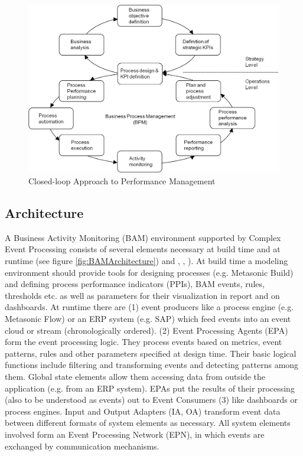 \begin{figure}[htbp]
	\centering
	\includegraphics[width=0.8\linewidth]{Figures/Chapter5/Monitoring/Approach-Performance-Mgmt.jpg}
	\caption[Closed-loop Approach to Performance Management]{Closed-loop Approach to Performance Management \cite{book:AnalytInfSys}}
	\label{fig:Approach-Performance}
\end{figure}



\subsection{Architecture }
A Business Activity Monitoring (BAM) environment supported by Complex Event Processing consists of several elements necessary at build time and at runtime (see figure \ref{fig:BAMArchitecture}) and \cite{book:processmonitoring}, \cite{book:CEPinAction} , \cite{article:BlueprintEventBPM}). At build time a modeling environment should provide tools for designing processes (e.g. Metasonic Build) and defining process performance indicators (PPIs), BAM events, rules, thresholds etc. as well as parameters for their visualization in report and on dashboards. At runtime there are (1) event producers like a process engine (e.g. Metasonic Flow) or an ERP system (e.g. SAP) which feed events into an event cloud or stream (chronologically ordered). (2) Event Processing Agents (EPA) form the event processing logic. They process events based on metrics, event patterns, rules and other parameters specified at design time. Their basic logical functions include filtering and transforming events and detecting patterns among them. Global state elements allow them accessing data from outside the application (e.g. from an ERP system). EPAs put the results of their processing (also to be understood as events) out to Event Consumers (3) like dashboards or process engines. Input and Output Adapters (IA, OA) transform event data between different formats of system elements as necessary. All system elements involved form an Event Processing Network (EPN), in which events are exchanged by communication mechanisms.

